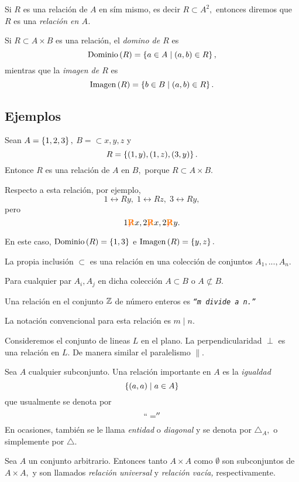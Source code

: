	Si $R$ es una relación de $A$ en sím mismo, es decir $R \subset A^{2},$ entonces diremos que $R$ es una \emph{relación en $A$.}



	\begin{definicion}
		Si $R \subset A \times B$ es una relación, el \emph{domino de $R$} es
		$$
		\operatorname{Dominio}\left( R \right)=\left\{ a\in A\mid (a,b)\in R \right\},
		$$ mientras que la \emph{imagen de $R$} es
		$$
		\operatorname{Imagen}\left( R \right)=\left\{ b\in B\mid (a,b)\in R \right\}.
		$$
	\end{definicion}



\subsection{Ejemplos}

	Sean $A=\left\{ 1,2,3 \right\},$ $B=\subset{x,y,z}$ y $$R=\left\{ (1,y), (1,z), (3,y) \right\}.$$ Entonce $R$ es una relación de $A$ en $B,$ porque $R \subset A \times B.$


	Respecto a esta relación, por ejemplo,
	$$
	1\rel{R}y, \; 1\rel{R}z, \; 3\rel{R}y,
	$$ pero
	$$
	1{ {\color{red}\not}{\color{orange}\textbf{R}} }x, 2{ {\color{red}\not}{\color{orange}\textbf{R}} }x, 2{ {\color{red}\not}{\color{orange}\textbf{R}} }y.
	$$


	En este caso, $\operatorname{Dominio}\left( R \right)=\left\{ 1,3 \right\}$ e $\operatorname{Imagen}\left( R \right)=\left\{ y,z \right\}.$



	La propia inclusión $\subset$ es una relación en una colección de conjuntos $A_{1},...,A_{n}.$

	Para cualquier par $A_{i}, A_{j}$ en dicha colección $A \subset B$ o $A \not\subset B.$



	Una relación en el conjunto $\mathbb{Z}$ de número enteros es \emph{\texttt{``$m$ divide a $n.$''}}


	La notación convencional para esta relación es \emph{$m \mid n.$}



	Consideremos el conjunto de lineas $L$ en el plano. La perpendicularidad $\perp$ es una relación en $L.$  De manera similar el paralelismo $\parallel.$



	Sea $A$ cualquier subconjunto. Una relación importante en $A$ es la \emph{igualdad}
	$$
	\left\{ (a,a) \mid a \in A \right\}
	$$ que usualmente se denota por \emph{$$``=''$$}
	 En ocasiones, tambi\'en se le llama \emph{entidad} o \emph{diagonal} y se denota por $\triangle_{A},$ o simplemente por $\triangle.$



	Sea $A$ un conjunto arbitrario. Entonces tanto $A\times A$ como $\emptyset$ son subconjuntos de $A \times A,$ y son llamados \emph{relación universal} y \emph{relación vacía,} respectivamente.



